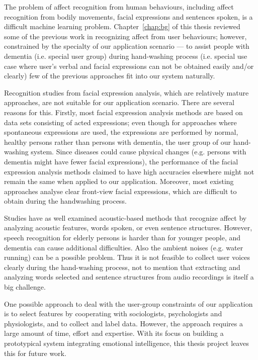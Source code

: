 The problem of affect recognition from human behaviours, including affect recognition from bodily movements, facial expressions and sentences spoken, is a difficult machine learning problem. Chapter~\ref{chap:bg} of this thesis reviewed some of the previous work in recognizing affect from user behaviours; however, constrained by the specialty of our application scenario --- to assist people with dementia (i.e. special user group) during hand-washing process (i.e. special use case where user's verbal and facial expressions can not be obtained easily and/or clearly) few of the previous approaches fit into our system naturally.

Recognition studies from facial expression analysis, which are relatively mature approaches, are not suitable for our application scenario. There are several reasons for this. Firstly, most facial expression analysis methods are based on data sets consisting of acted expressions; even though for approaches where spontaneous expressions are used, the expressions are performed by normal, healthy persons rather than persons with dementia, the user group of our hand-washing system. Since diseases could cause physical changes (e.g. persons with dementia might have fewer facial expressions), the performance of the facial expression analysis methods claimed to have high accuracies elsewhere might not remain the same when applied to our application. Moreover, most existing approaches analyse clear front-view facial expressions, which are difficult to obtain during the handwashing process. 

Studies have as well examined acoustic-based methods that recognize affect by analyzing acoustic features, words spoken, or even sentence structures. However, speech recognition for elderly persons is harder than for younger people, and dementia can cause additional difficulties. Also the ambient noises (e.g. water running) can be a possible problem. Thus it is not feasible to collect user voices clearly during the hand-washing process, not to mention that extracting and analyzing words selected and sentence structures from audio recordings is itself a big challenge. 

One possible approach to deal with the user-group constraints of our application is to select features by cooperating with sociologists, psychologists and physiologists, and to collect and label data. However, the approach requires a large amount of time, effort and expertise. With its focus on building a prototypical system integrating emotional intelligence, this thesis project leaves this for future work.

